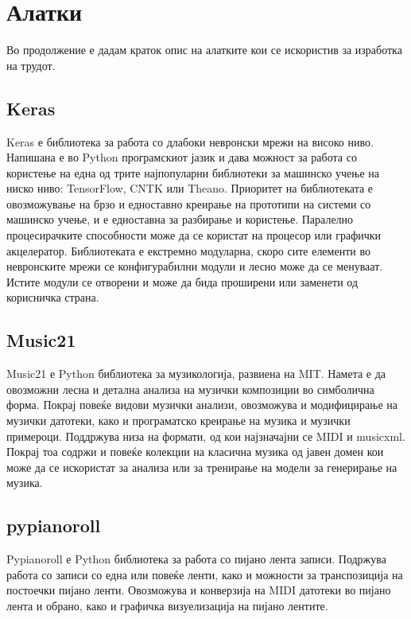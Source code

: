 \chapter{Алатки}
\label{ch:alatki}

Во продолжение е дадам краток опис на алатките кои се искористив за изработка на трудот.

\section{Keras}

Keras е библиотека за работа со длабоки невронски мрежи на високо ниво. Напишана е во Python програмскиот јазик и дава можност за работа со користење на една од трите најпопуларни библиотеки за машинско учење на ниско ниво: TensorFlow, CNTK или Theano. Приоритет на библиотеката е овозможување на брзо и едноставно креирање на прототипи на системи со машинско учење, и е едноставна за разбирање и користење. Паралелно процесирачките способности може да се користат на процесор или графички акцелератор. Библиотеката е екстремно модуларна, скоро сите елементи во невронските мрежи се конфигурабилни модули и лесно може да се менуваат. Истите модули се отворени и може да бида проширени или заменети од корисничка страна.

\section{Music21}

Music21 е Python библиотека за музикологија, развиена на MIT. Намета е да овозможни лесна и детална анализа на музички композиции во симболична форма. Покрај повеќе видови музички анализи, овозможува и модифицирање на музички датотеки, како и програматско креирање на музика и музички примероци. Поддржува низа на формати, од кои најзначајни се MIDI и musicxml. Покрај тоа содржи и повеќе колекции на класична музика од јавен домен кои може да се искористат за анализа или за тренирање на модели за генерирање на музика. 

\section{pypianoroll}

Pypianoroll е Python библиотека за работа со пијано лента записи. Подржува работа со записи со една или повеќе ленти, како и можности за транспозиција на постоечки пијано ленти. Овозможува и конверзија на MIDI датотеки во пијано лента и обрано, како и графичка визуелизација на пијано лентите.

